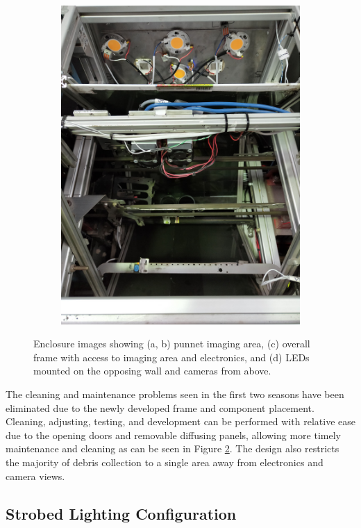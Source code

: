 \documentclass[fleqn,twoside,12pt]{report}
\begin{document}
\begin{figure}[h]
\begin{subfigure}{.25\textwidth}
		\includegraphics[width=0.9\linewidth]{clean_4.jpg}
		\caption{}
		\label{fig:clean_4}
	\end{subfigure}%
	
	\caption{Enclosure images showing (a, b) punnet imaging area, (c) overall frame with access to imaging area and electronics, and (d) LEDs mounted on the opposing wall and cameras from above.}
	\label{fig:clean_enclosure}
\end{figure}



The cleaning and maintenance problems seen in the first two seasons have been eliminated due to the newly developed frame and component placement. Cleaning, adjusting, testing, and development can be performed with relative ease due to the opening doors and removable diffusing panels, allowing more timely maintenance and cleaning as can be seen in Figure \ref{fig:clean_enclosure}. The design also restricts the majority of debris collection to a single area away from electronics and camera views.


\subsection{Strobed Lighting Configuration}
\end{document}
